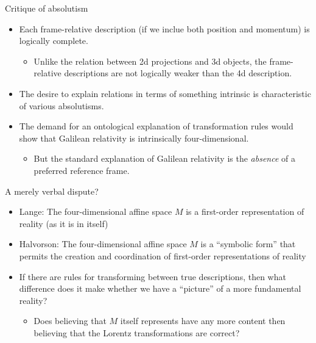 \documentclass[fleqn]{beamer}
\begin{document}
\begin{frame}{Critique of absolutism}

  \begin{itemize}
  \item Each frame-relative description (if we inclue both position
    and momentum) is logically complete.
    \begin{itemize}
    \item Unlike the relation between 2d projections and 3d objects,
      the frame-relative descriptions are not logically weaker than
      the 4d description.
    \end{itemize}
  \item The desire to explain relations in terms of something
    intrinsic is characteristic of various absolutisms.
    \item The demand for an ontological explanation of transformation
    rules would show that Galilean relativity is intrinsically
    four-dimensional.
    \begin{itemize}
    \item But the standard explanation of Galilean relativity is the
      \textit{absence} of a preferred reference frame. \end{itemize}
  
  \end{itemize}

\end{frame}

\begin{frame}{A merely verbal dispute?}

  \begin{itemize}

  \item Lange: The four-dimensional affine space $M$ is a first-order
    representation of reality (as it is in itself)

  \item Halvorson: The four-dimensional affine space $M$ is a
    ``symbolic form'' that permits the creation and coordination of
    first-order representations of reality

  \item If there are rules for transforming between true descriptions,
    then what difference does it make whether we have a ``picture'' of
    a more fundamental reality?

    \begin{itemize}
    \item Does believing that $M$ itself represents have any more
      content then believing that the Lorentz transformations are
      correct? \end{itemize}

  \end{itemize}

  

\end{frame}
\end{document}
